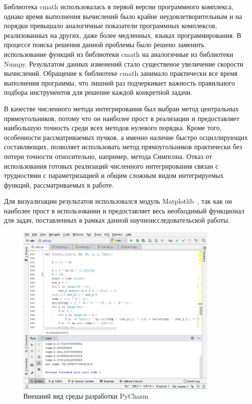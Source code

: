 {    Библиотека cmath использовалась в первой версии программного комплекса,
    однако время выполнения вычислений было крайне неудовлетворительным и на порядки превышало аналогичные показатели программных комплексов,
    реализованных на других, даже более медленных, языках программирования.
    В процессе поиска решения данной проблемы было решено заменить использование функций из библиотеки cmath на аналогичные из библиотеки Numpy.
    Результатом данных изменений стало существеное увеличение скорости вычислений.
    Обращение к библиотеке cmath занимало практически все время выполнения программы,
    что лишний раз подчеркивает важность правильного подбора инструментов для решение каждой конкретной задачи.

    В качестве численного метода интегрирования был выбран метод
    центральных прямоугольников, потому что он наиболее прост в реализации и
    предоставляет наибольшую точность среди всех методов нулевого порядка.
    Кроме того, особенности рассматриваемых пучков, а именно наличие быстро осциллирующих составляющих,
    позволяет использовать метод прямоугольников практически без потери точности относительно, например, метода Симпсона.
    Отказ от использования готовых реализаций численного интегрирования связан
    с трудностями с параметризацией и общим сложным видом интегрируемых
    функций, рассматриваемых в работе.

    Для визуализации результатов использовался модуль Matplotlib~\cite{plt},
    так как он наиболее прост в использовании и предоставляет весь
    необходимый функционал для задач, поставленных в рамках данной научноисследовательской работы.

    \begin{figure}[H]
        \begin{center}
            \includegraphics[width=10cm]{plots/pycharm1}
            \vspace{0.4cm}
            \caption{Внешний вид среды разработки PyCharm}
            \label{pycharm}
        \end{center}
    \end{figure}

}
